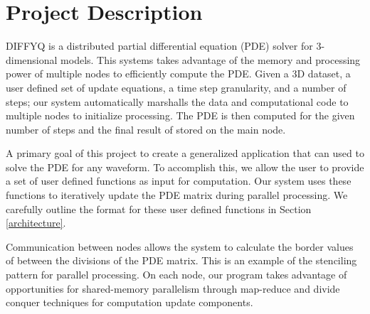 \section{Project Description}
DIFFYQ is a distributed partial differential equation (PDE) solver for 3-dimensional models.  This systems takes advantage of the memory and processing power of multiple nodes to efficiently compute the PDE.  Given a 3D dataset, a user defined set of update equations, a time step granularity, and a number of steps; our system automatically marshalls the data and computational code to multiple nodes to initialize processing.  The PDE is then computed for the given number of steps and the final result of stored on the main node.

A primary goal of this project to create a generalized application that can used to solve the PDE for any waveform.  To accomplish this, we allow the user to provide a set of user defined functions as input for computation.  Our system uses these functions to iteratively update the PDE matrix during parallel processing.  We carefully outline the format for these user defined functions in Section \ref{architecture}.

Communication between nodes allows the system to calculate the border values of between the divisions of the PDE matrix.  This is an example of the stenciling pattern for parallel processing.  On each node, our program takes advantage of opportunities for shared-memory parallelism through map-reduce and divide conquer techniques for computation update components.
